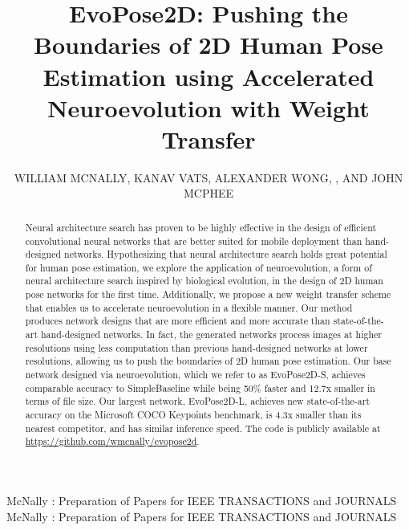 \documentclass{ieeeaccess}
\begin{document}

\title{EvoPose2D: Pushing the Boundaries of 2D Human Pose Estimation using Accelerated Neuroevolution with Weight Transfer}
\author{
\uppercase{William McNally}, 
\uppercase{Kanav Vats},
\uppercase{Alexander Wong}, ,
\uppercase{and John McPhee}
}
\address[]{Department of Systems Design Engineering, University of Waterloo, Waterloo, ON N2L 3G1}
\address[]{Waterloo Artificial Intelligence Institute, University of Waterloo, Waterloo, ON, N2L 3G1}

\markboth
{McNally \headeretal: Preparation of Papers for IEEE TRANSACTIONS and JOURNALS}
{McNally \headeretal: Preparation of Papers for IEEE TRANSACTIONS and JOURNALS}


\begin{abstract}
Neural architecture search has proven to be highly effective in the design of efficient convolutional neural networks that are better suited for mobile deployment than hand-designed networks. Hypothesizing that neural architecture search holds great potential for human pose estimation, we explore the application of neuroevolution, a form of neural architecture search inspired by biological evolution, in the design of 2D human pose networks for the first time. Additionally, we propose a new weight transfer scheme that enables us to accelerate neuroevolution in a flexible manner. Our method produces network designs that are more efficient and more accurate than state-of-the-art hand-designed networks. In fact, the generated networks process images at higher resolutions using less computation than previous hand-designed networks at lower resolutions, allowing us to push the boundaries of 2D human pose estimation. Our base network designed via neuroevolution, which we refer to as EvoPose2D-S, achieves comparable accuracy to SimpleBaseline while being 50\% faster and 12.7x smaller in terms of file size. Our largest network, EvoPose2D-L, achieves new state-of-the-art accuracy on the Microsoft COCO Keypoints benchmark, is 4.3x smaller than its nearest competitor, and has similar inference speed. The code is publicly available at \url{https://github.com/wmcnally/evopose2d}.
\end{abstract}
\end{document}
